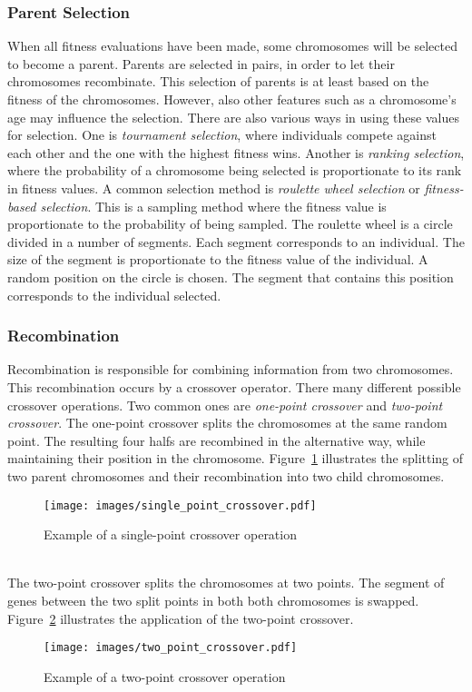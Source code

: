 \subsubsection{Parent Selection}
When all fitness evaluations have been made, some chromosomes will be selected
to become a parent. Parents are selected in pairs, in order to let their
chromosomes recombinate. This selection of parents is at least based on the
fitness of the chromosomes. However, also other features such as a chromosome's
age may influence the selection. There are also various ways in using these
values for selection. One is \emph{tournament selection}, where individuals
compete against each other and the one with the highest fitness wins. Another
is \emph{ranking selection}, where the probability of a chromosome being
selected is proportionate to its rank in fitness values. A common selection
method is \emph{roulette wheel selection} or \emph{fitness-based selection}.
This is a sampling method where the fitness value is proportionate to the
probability of being sampled. The roulette wheel is a circle divided in a
number of segments. Each segment corresponds to an individual. The size of the
segment is proportionate to the fitness value of the individual. A random
position on the circle is chosen. The segment that contains this position
corresponds to the individual selected.
\subsubsection{Recombination}
Recombination is responsible for combining information from two chromosomes.
This recombination occurs by a crossover operator. There many different
possible crossover operations. Two common ones are \emph{one-point crossover}
and \emph{two-point crossover}. The one-point crossover splits the chromosomes
at the same random point. The resulting four halfs are recombined in the
alternative way, while maintaining their position in the chromosome.
Figure~\ref{fig:single_point_crossover} illustrates the splitting of two parent
chromosomes and their recombination into two child chromosomes.\\
\begin{figure}[h]
	\centering
	\texttt{[image: images/single\_point\_crossover.pdf]}
	\caption{Example of a single-point crossover operation}
	\label{fig:single_point_crossover}
\end{figure}\\
\noindent
The two-point crossover splits the chromosomes at two points. The segment of
genes between the two split points in both both chromosomes is swapped.
Figure~\ref{fig:two_point_crossover} illustrates the application of the
two-point crossover.\\
\begin{figure}[h]
	\centering
	\texttt{[image: images/two\_point\_crossover.pdf]}
	\caption{Example of a two-point crossover operation}
	\label{fig:two_point_crossover}
\end{figure}%
